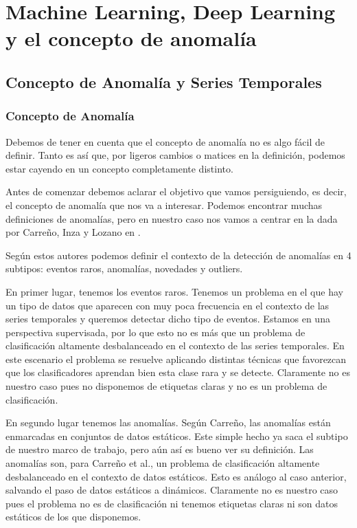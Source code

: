 \part{Machine Learning, Deep Learning y el concepto de anomalía}
\label{part:machine_learning_deep_learning_anomalia}

\chapter{Concepto de Anomalía y Series Temporales}
\label{chapter:anomalia}

\section{Concepto de Anomalía}

Debemos de tener en cuenta que el concepto de anomalía no es algo fácil de definir. Tanto es así que, por ligeros cambios o matices en la definición, podemos estar cayendo en un concepto completamente distinto.

Antes de comenzar debemos aclarar el objetivo que vamos persiguiendo, es decir, el concepto de anomalía que nos va a interesar. Podemos encontrar muchas definiciones de anomalías, pero en nuestro caso nos vamos a centrar en la dada por Carreño, Inza y Lozano en \cite{ander_analyzing_2019}.

Según estos autores podemos definir el contexto de la detección de anomalías en 4 subtipos: eventos raros, anomalías, novedades y outliers. 

En primer lugar, tenemos los eventos raros. Tenemos un problema en el que hay un tipo de datos que aparecen con muy poca frecuencia en el contexto de las series temporales y queremos detectar dicho tipo de eventos. Estamos en una perspectiva supervisada, por lo que esto no es más que un problema de clasificación altamente desbalanceado en el contexto de las series temporales. En este escenario el problema se resuelve aplicando distintas técnicas que favorezcan que los clasificadores aprendan bien esta clase rara y se detecte. Claramente no es nuestro caso pues no disponemos de etiquetas claras y no es un problema de clasificación.

En segundo lugar tenemos las anomalías. Según Carreño, las anomalías están enmarcadas en conjuntos de datos estáticos. Este simple hecho ya saca el subtipo de nuestro marco de trabajo, pero aún así es bueno ver su definición. Las anomalías son, para Carreño et al., un problema de clasificación altamente desbalanceado en el contexto de datos estáticos. Esto es análogo al caso anterior, salvando el paso de datos estáticos a dinámicos. Claramente no es nuestro caso pues el problema no es de clasificación ni tenemos etiquetas claras ni son datos estáticos de los que disponemos.

